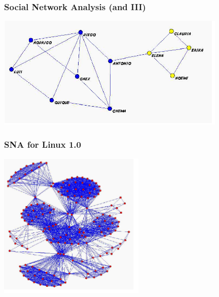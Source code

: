 \documentclass{beamer}
\begin{document}

\begin{frame}
\frametitle{Social Network Analysis (and III)}

\begin{center}
\includegraphics[width=11cm]{figs/sna-two.png}
\end{center}

\end{frame}


\begin{frame}
\frametitle{SNA for Linux 1.0}

\begin{center}
\includegraphics[width=7cm]{figs/linux1-sna.png}
\end{center}

\end{frame}

\end{document}
